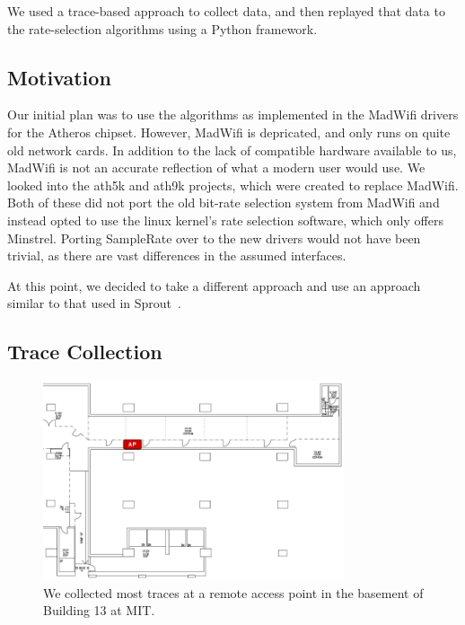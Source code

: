 \documentclass[letterpaper,twocolumn,10pt]{article}
\begin{document}
We used a trace-based approach to collect data, and then replayed that data to the rate-selection algorithms using a Python framework.

\subsection{Motivation}

Our initial plan was to use the algorithms as implemented in the MadWifi drivers for the Atheros chipset. However, MadWifi is depricated, and only runs on quite old network cards. In addition to the lack of compatible hardware available to us, MadWifi is not an accurate reflection of what a modern user would use. We looked into the ath5k and ath9k projects, which were created to replace MadWifi. Both of these did not port the old bit-rate selection system from MadWifi and instead opted to use the linux kernel's rate selection software, which only offers Minstrel. Porting SampleRate over to the new drivers would not have been trivial, as there are vast differences in the assumed interfaces. 

At this point, we decided to take a different approach and use an approach similar to that used in Sprout~\cite{sprout}.


\subsection{Trace Collection}

\begin{figure}[hbt]
  \hspace{-0.5em}\includegraphics[width=3.5in]{bsmt13floorplan.png}\vspace{-0em}
  \caption{We collected most traces at a remote access point in the basement of Building 13 at MIT.}
\end{figure}
\end{document}
